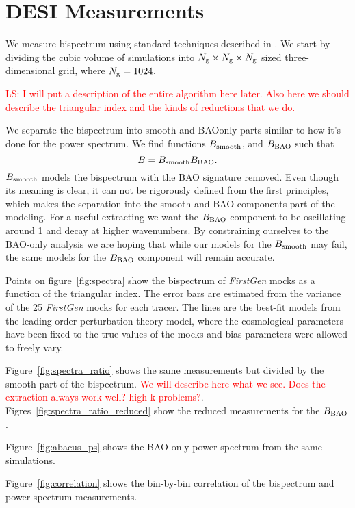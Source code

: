 \section{DESI Measurements}\label{sec:measurements}

We measure bispectrum using standard techniques described in \cite{}. We start by dividing the cubic volume of simulations into $N_\mathrm{g} \times N_\mathrm{g}\times N_\mathrm{g}$ sized three-dimensional grid, where $N_\mathrm{g} = 1024$.

\textcolor{red}{LS: I will put a description of the entire algorithm here later. Also here we should describe the triangular index and the kinds of reductions that we do.}

We separate the bispectrum into smooth and BAOonly parts similar to how it's done for the power spectrum. We find functions $B_\mathrm{smooth}$, and $B_\mathrm{BAO}$ such that
\begin{equation}
    B = B_\mathrm{smooth}B_\mathrm{BAO}.
\end{equation}
$B_\mathrm{smooth}$ models the bispectrum with the BAO signature removed. Even though its meaning is clear, it can not be rigorously defined from the first principles, which makes the separation into the smooth and BAO components part of the modeling. For a useful extracting we want the $B_\mathrm{BAO}$ component to be oscillating around 1 and decay at higher wavenumbers. By constraining ourselves to the BAO-only analysis we are hoping that while our models for the $B_\mathrm{smooth}$ may fail, the same models for the $B_\mathrm{BAO}$ component will remain accurate.


Points on figure~\ref{fig:spectra} show the bispectrum of \textit{FirstGen} mocks as a function of the triangular index. The error bars are estimated from the variance of the 25 \textit{FirstGen} mocks for each tracer. The lines are the best-fit models from the leading order perturbation theory model, where the cosmological parameters have been fixed to the true values of the mocks and bias parameters were allowed to freely vary.  

Figure~\ref{fig:spectra_ratio} shows the same measurements but divided by the smooth part of the bispectrum. \textcolor{red}{We will describe here what we see. Does the extraction always work well? high k problems?}. Figres~\ref{fig:spectra_ratio_reduced} show the reduced measurements for the $B_\mathrm{BAO}$.

Figure~\ref{fig:abacus_ps} shows the BAO-only power spectrum from the same simulations. 

Figure~\ref{fig:correlation} shows the bin-by-bin correlation of the bispectrum and power spectrum measurements.